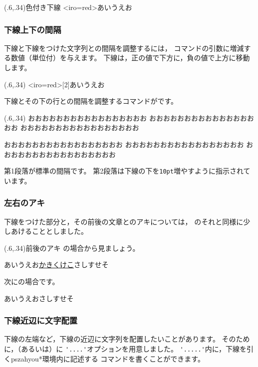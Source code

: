 \documentclass[a4j]{jarticle}
\begin{document}
\begin{showEx}(.6,.34){色付き下線}
\pskasen<iro=red>{あいうえお}
\end{showEx}

\subsubsection{下線上下の間隔}
下線と下線をつけた文字列との間隔を調整するには，
コマンドの引数に増減する数値（単位付）を与えます。
下線は，正の値で下方に，負の値で上方に移動します。

\begin{showEx}(.6,.34){}
\kasenUehosei{-6pt}%
\pskasen<iro=red>[2]{あいうえお}
\end{showEx}

下線とその下の行との間隔を調整するコマンドがです。

\begin{showEx}(.6,.34){}
おおおおおおおおおおおおおおおおお
おおおおおおおおおおおおおおおおお
おおおおおおおおおおおおおおおおお

\kasenSitahosei{10pt}%
おおおおおおおおおおおおおおおおお
おおおおおおおおおおおおおおおおお
おおおおおおおおおおおおおおおおお
\end{showEx}

第1段落が標準の間隔です。
第2段落は下線の下を\texttt{10pt}増やすように指示されています。

\subsubsection{左右のアキ}\label{zengo}
下線をつけた部分と，その前後の文章とのアキについては，
のそれと同様に少しあけることとしました。

\begin{showEx}(.6,.34){前後のアキ}
の場合から見ましょう。

あいうえお\underline{かきくけこ}さしすせそ

次にの場合です。

あいうえおさしすせそ
\end{showEx}



\subsubsection{下線近辺に文字配置}\label{sayuu}
下線の左端など，下線の近辺に文字列を配置したいことがあります。
そのために，（あるいは）に
\verb+'....'+オプションを用意しました。
\verb+'.....'+内に，下線を引く\textsf{pszahyou*}環境内に記述する
コマンドを書くことができます。
\end{document}
